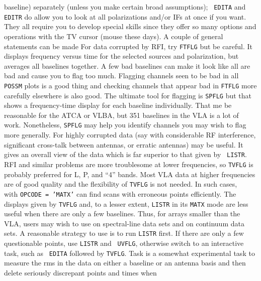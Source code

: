 baseline) separately (unless you make certain broad assumptions); {\tt
EDITA} and {\tt EDITR} do allow you to look at all polarizations
and/or IFs at once if you want.  They all require you to develop
special skills since they offer so many options and operations with
the TV cursor (mouse these days).  A couple of general statements can
be made
\xbit
\Item For data corrupted by RFI, try {\tt FTFLG} but be careful.  It
    displays frequency versus time for the selected sources and
    polarization, but averages all baselines together.  A few bad
    baselines can make it look like all are bad and cause you to flag
    too much.  Flagging channels seen to be bad in all {\tt POSSM}
    plots is a good thing and checking channels that appear bad in
    {\tt FTFLG} more carefully elsewhere is also good.
\Item The ultimate tool for  flagging is {\tt SPFLG} but
    that shows a frequency-time display for each baseline
    individually.  That me be reasonable for the ATCA or VLBA, but 351
    baselines in the VLA is a lot of work.  Nonetheless, {\tt SPFLG}
    may help you identify channels you may wish to flag more generally.
\Item For highly corrupted data (say with considerable RF
    interference, significant cross-talk between antennas, or erratic
    antennas) {\tt {}} may be useful.  It gives an overall
    view of the data which is far superior to that given by {\tt
    LISTR}\@.  RFI and similar problems are more troublesome at lower
    frequencies, so {\tt TVFLG} is probably preferred for L, P, and
    ``4'' bands.
\Item Most VLA data at higher frequencies are of good quality and
    the flexibility of {\tt TVFLG} is not needed.  In such cases, {\tt
    } with {\tt OPCODE = 'MATX'} can find scans with
    erroneous points efficiently.
\Item The displays given by {\tt TVFLG} and, to a lesser extent,
    {\tt LISTR} in its {\tt MATX} mode are less useful when there are
    only a few baselines.  Thus, for arrays smaller than the VLA,
    users may wish to use {\tt {}} on spectral-line data
    sets and {\tt {}} on continuum data sets.
\Item A reasonable strategy to use is to run {\tt LISTR} first.  If
    there are only a few questionable points, use {\tt LISTR} and {\tt
    UVFLG}, otherwise switch to an interactive task, such as {\tt
    EDITA} followed by \hbox{{\tt TVFLG}}.
\Item Task {\tt {}} is a somewhat experimental task to
    measure the rms in the data on either a baseline or an antenna
    basis and then delete seriously discrepant points and times when
